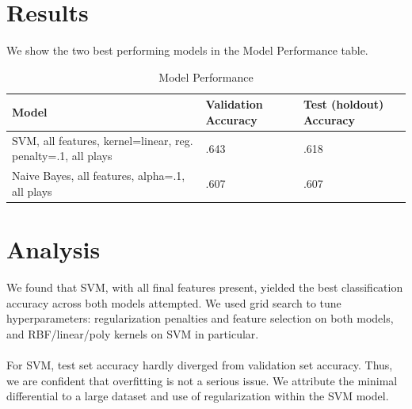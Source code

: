 \documentclass[letterpaper, 10 pt, conference]{ieeeconf}  %
\begin{document}
  \section{Results}
    We show the two best performing models in the Model Performance table.
    \begin{table}[h]
      \caption{Model Performance}
      \label{table_example}
      \begin{center}
        \begin{tabular}{| p{2cm}  | p{1.5cm} | p{1.5cm} |}
        \hline
        Model & Validation Accuracy & Test (holdout) Accuracy\\
        \hline
        SVM, all features, kernel=linear, reg. penalty=.1, all plays & .643 & .618\\
        \hline
        Naive Bayes, all features, alpha=.1, all plays & .607 & .607\\
        \hline
        \end{tabular}
      \end{center}
    \end{table}

  \section{Analysis}
  We found that SVM, with all final features present, yielded the best classification accuracy across both models attempted. We used grid search to tune hyperparameters: regularization penalties and feature selection on both models, and RBF/linear/poly kernels on SVM in particular. 
  \\
  \\
  For SVM, test set accuracy hardly diverged from validation set accuracy. Thus, we are confident that overfitting is not a serious issue. We attribute the minimal differential to a large dataset and use of regularization within the SVM model.
  \\ 
\end{document}
